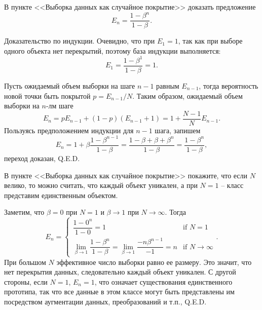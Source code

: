 \begin{problem}
    В пункте <<Выборка данных как случайное покрытие>>  доказать предложение
    \[
        E_n=\dfrac{1-\beta^n}{1-\beta}.
    \]
\end{problem}

\begin{solution}
    Доказательство по индукции. Очевидно, что при $E_1=1$, так как при выборе одного объекта нет перекрытий, поэтому база индукции выполняется:
    \[
        E_1=\dfrac{1-\beta^1}{1-\beta}=1.
    \]

    Пусть ожидаемый объем выборки на шаге $n-1$ равным $E_{n-1}$, тогда вероятность новой точки быть покрытой $p=E_{n-1}/N$. Таким образом, ожидаемый объем выборки на $n$-лм шаге
    \[
        E_n=pE_{n-1}+(1-p)(E_{n-1}+1)=1+\dfrac{N-1}{N}E_{n-1}.
    \]
    Пользуясь предположением индукции для $n-1$ шага, запишем
    \[
        E_n=1+\beta\dfrac{1-\beta^{n-1}}{1-\beta}=\dfrac{1-\beta+\beta+\beta^{n}}{1-\beta}=\dfrac{1-\beta^{n}}{1-\beta},
    \]
    переход доказан, Q.E.D.
\end{solution}

\begin{problem}
    В пункте <<Выборка данных как случайное покрытие>>  покажите, что если $N$ велико, то можно считать, что каждый объект уникален, а при $N=1$ -- класс представим единственным объектом.
\end{problem}

\begin{solution}
    Заметим, что $\beta=0$ при $N=1$ и $\beta \to 1$ при $N \to \infty$. Тогда
    \[
        E_n=\begin{cases}
            \dfrac{1-0^n}{1-0}=1 & \text{if } N=1 \\
            \lim\limits_{\beta \to 1}\dfrac{1-\beta^n}{1-\beta}=\lim\limits_{\beta \to 1}\dfrac{-n\beta^{n-1}}{-1}=n & \text{if } N \to \infty
        \end{cases}.
    \]
    При большом $N$ эффективное число выборки равно ее размеру. Это значит, что нет перекрытия данных, следовательно каждый объект уникален. С другой стороны, если $N=1$, $E_n=1$, что означает существования единственного прототипа, так что все данные в этом классе могут быть представлены им посредством аугментации данных, преобразований и т.п., Q.E.D.
\end{solution}
